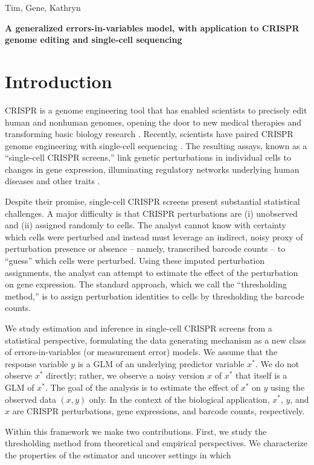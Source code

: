 \documentclass[12pt]{article}
\begin{document}
\noindent
Tim, Gene, Kathryn
\begin{center}
\textbf{A generalized errors-in-variables model, with application to CRISPR genome editing and single-cell sequencing}
\end{center}

\section{Introduction}
CRISPR is a genome engineering tool that has enabled scientists to precisely edit human and nonhuman genomes, opening the door to new medical therapies \cite{Rothgangl2021,Musunuru2021} and transforming basic biology research \cite{Przybyla2021}. Recently, scientists have paired CRISPR genome engineering with single-cell sequencing \cite{Dixit2016,Datlinger2017}. The resulting assays, known as a ``single-cell CRISPR screens,'' link genetic perturbations in individual cells to changes in gene expression, illuminating regulatory networks underlying human diseases and other traits \cite{Morris2021a}.

Despite their promise, single-cell CRISPR screens present substantial statistical challenges. A major difficulty is that CRISPR perturbations are (i) unobserved and (ii) assigned randomly to cells. The analyst cannot know with certainty which cells were perturbed and instead must leverage an indirect, noisy proxy of perturbation presence or absence -- namely, transcribed barcode counts -- to ``guess'' which cells were perturbed. Using these imputed perturbation assignments, the analyst can attempt to estimate the effect of the perturbation on gene expression. The standard approach, which we call the ``thresholding method,'' is to assign perturbation identities to cells by thresholding the barcode counts.

We study estimation and inference in single-cell CRISPR screens from a statistical perspective, formulating the data generating mechanism as a new class of errors-in-variables (or measurement error) models. We assume that the response variable $y$ is a GLM of an underlying predictor variable $x^*$. We do not observe $x^*$ directly; rather, we observe a noisy version $x$ of $x^*$ that itself is a GLM of $x^*$. The goal of the analysis is to estimate the effect of $x^*$ on $y$ using the observed data $(x , y)$ only. In the context of the biological application, $x^*$, $y$, and $x$ are CRISPR perturbations, gene expressions, and barcode counts, respectively.

Within this framework we make two contributions. First, we study the thresholding method from theoretical and empirical perspectives. We characterize the properties of the estimator and uncover settings in which 
\end{document}
